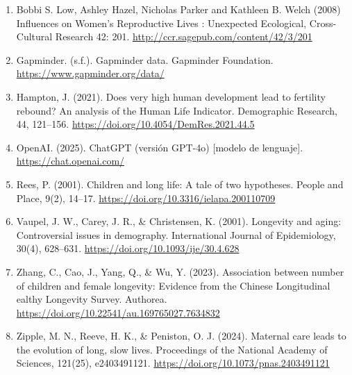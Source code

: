 \documentclass[
]{article}
\providecommand{\tightlist}{%
  \setlength{\itemsep}{0pt}\setlength{\parskip}{0pt}}
\begin{document}
\begin{enumerate}
\def\labelenumi{\arabic{enumi}.}
\tightlist
\item
  Bobbi S. Low, Ashley Hazel, Nicholas Parker and Kathleen B. Welch
  (2008) Influences on Women's Reproductive Lives : Unexpected
  Ecological, Cross-Cultural Research 42: 201.
  \url{http://ccr.sagepub.com/content/42/3/201}
\item
  Gapminder. (s.f.). Gapminder data. Gapminder Foundation.
  \url{https://www.gapminder.org/data/}
\item
  Hampton, J. (2021). Does very high human development lead to fertility
  rebound? An analysis of the Human Life Indicator. Demographic
  Research, 44, 121--156. \url{https://doi.org/10.4054/DemRes.2021.44.5}
\item
  OpenAI. (2025). ChatGPT (versión GPT-4o) {[}modelo de lenguaje{]}.
  \url{https://chat.openai.com/}
\item
  Rees, P. (2001). Children and long life: A tale of two hypotheses.
  People and Place, 9(2), 14--17.
  \url{https://doi.org/10.3316/ielapa.200110709}
\item
  Vaupel, J. W., Carey, J. R., \& Christensen, K. (2001). Longevity and
  aging: Controversial issues in demography. International Journal of
  Epidemiology, 30(4), 628--631.
  \url{https://doi.org/10.1093/ije/30.4.628}
\item
  Zhang, C., Cao, J., Yang, Q., \& Wu, Y. (2023). Association between
  number of children and female longevity: Evidence from the Chinese
  Longitudinal ealthy Longevity Survey. Authorea.
  \url{https://doi.org/10.22541/au.169765027.7634832}
\item
  Zipple, M. N., Reeve, H. K., \& Peniston, O. J. (2024). Maternal care
  leads to the evolution of long, slow lives. Proceedings of the
  National Academy of Sciences, 121(25), e2403491121.
  \url{https://doi.org/10.1073/pnas.2403491121}
\end{enumerate}
\end{document}
